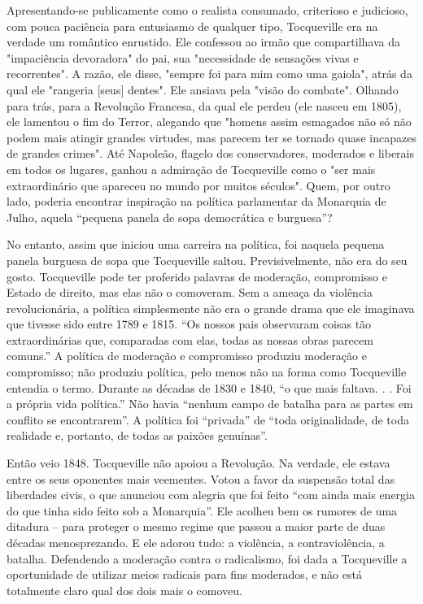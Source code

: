 Apresentando-se publicamente como o realista consumado, criterioso e judicioso, com pouca paciência para entusiasmo de qualquer tipo, Tocqueville era na verdade um romântico enrustido. Ele confessou ao irmão que compartilhava da "impaciência devoradora" do pai, sua "necessidade de sensações vivas e recorrentes". A razão, ele disse, "sempre foi para mim como uma gaiola", atrás da qual ele "rangeria [seus] dentes". Ele ansiava pela "visão do combate". Olhando para trás, para a Revolução Francesa, da qual ele perdeu (ele nasceu em 1805), ele lamentou o fim do Terror, alegando que "homens assim esmagados não só não podem mais atingir grandes virtudes, mas parecem ter se tornado quase incapazes de grandes crimes". Até Napoleão, flagelo dos conservadores, moderados e liberais em todos os lugares, ganhou a admiração de Tocqueville como o "ser mais extraordinário que apareceu no mundo por muitos séculos". Quem, por outro lado, poderia encontrar inspiração na política parlamentar da Monarquia de Julho, aquela “pequena panela de sopa democrática e burguesa”?
 \par 
No entanto, assim que iniciou uma carreira na política, foi naquela pequena panela burguesa de sopa que Tocqueville saltou. Previsivelmente, não era do seu gosto. Tocqueville pode ter proferido palavras de moderação, compromisso e Estado de direito, mas elas não o comoveram. Sem a ameaça da violência revolucionária, a política simplesmente não era o grande drama que ele imaginava que tivesse sido entre 1789 e 1815. “Os nossos pais observaram coisas tão extraordinárias que, comparadas com elas, todas as nossas obras parecem comuns.” A política de moderação e compromisso produziu moderação e compromisso; não produziu política, pelo menos não na forma como Tocqueville entendia o termo. Durante as décadas de 1830 e 1840, “o que mais faltava. . . Foi a própria vida política.” Não havia “nenhum campo de batalha para as partes em conflito se encontrarem”. A política foi “privada” de “toda originalidade, de toda realidade e, portanto, de todas as paixões genuínas”.
 \par 
Então veio 1848. Tocqueville não apoiou a Revolução. Na verdade, ele estava entre os seus oponentes mais veementes. Votou a favor da suspensão total das liberdades civis, o que anunciou com alegria que foi feito “com ainda mais energia do que tinha sido feito sob a Monarquia”. Ele acolheu bem os rumores de uma ditadura – para proteger o mesmo regime que passou a maior parte de duas décadas menosprezando. E ele adorou tudo: a violência, a contraviolência, a batalha. Defendendo a moderação contra o radicalismo, foi dada a Tocqueville a oportunidade de utilizar meios radicais para fins moderados, e não está totalmente claro qual dos dois mais o comoveu.
